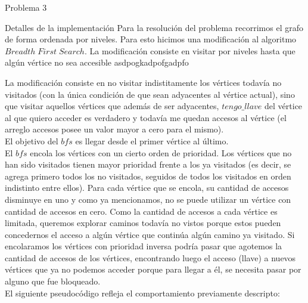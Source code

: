 \begin{section}{Problema 3}
\begin{subsection}{Detalles de la implementación}
		Para la resolución del problema recorrimos el grafo de forma ordenada por niveles. Para esto hicimos una modificación al algoritmo $Breadth\; First\; Search$. La modificación consiste en visitar por niveles hasta que algún vértice no sea accesible  asdpogkadpofgadpfo 




La modificación consiste en no visitar indistitamente los vértices todavía no visitados (con la única condición de que sean adyacentes al vértice actual), sino que visitar aquellos vértices que además de ser adyacentes, $tengo\_llave$ del vértice al que quiero acceder es verdadero y todavía me quedan accesos al vértice (el arreglo accesos posee un valor mayor a cero para el mismo).\\

		El objetivo del $bfs$ es llegar desde el primer vértice al último.\\

		El $bfs$ encola los vértices con un cierto orden de prioridad. Los vértices que no han sido visitados tienen mayor prioridad frente a los ya visitados (es decir, se agrega primero todos los no visitados, seguidos de todos los visitados en orden indistinto entre ellos). Para cada vértice que se encola, su cantidad de accesos disminuye en uno y como ya mencionamos, no se puede utilizar un vértice con cantidad de accesos en cero. Como la cantidad de accesos a cada vértice es limitada, queremos explorar caminos todavía no vistos porque estos pueden concedernos el acceso a algún vértice que continúa algún camino ya visitado. Si encolaramos los vértices con prioridad inversa podría pasar que agotemos la cantidad de accesos de los vértices, encontrando luego el acceso (llave) a nuevos vértices que ya no podemos acceder porque para llegar a él, se necesita pasar por alguno que fue bloqueado.\\

		El siguiente pseudocódigo refleja el comportamiento previamente descripto:\\


\end{subsection}
\end{section}
